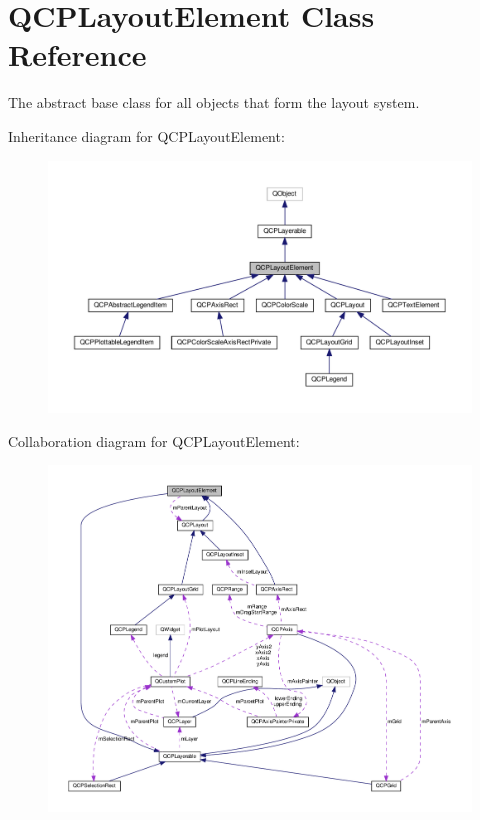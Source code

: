 \hypertarget{classQCPLayoutElement}{}\section{Q\+C\+P\+Layout\+Element Class Reference}
\label{classQCPLayoutElement}


The abstract base class for all objects that form the layout system.  




Inheritance diagram for Q\+C\+P\+Layout\+Element\+:\nopagebreak
\begin{figure}[H]
\begin{center}
\leavevmode
\includegraphics[width=350pt]{classQCPLayoutElement__inherit__graph}
\end{center}
\end{figure}


Collaboration diagram for Q\+C\+P\+Layout\+Element\+:\nopagebreak
\begin{figure}[H]
\begin{center}
\leavevmode
\includegraphics[width=350pt]{classQCPLayoutElement__coll__graph}
\end{center}
\end{figure}
